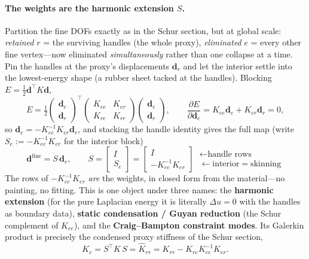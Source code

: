 \paragraph{The weights are the harmonic extension $S$.}
Partition the fine DOFs exactly as in the Schur section, but at global scale: \emph{retained} $r$ = the surviving handles (the whole proxy), \emph{eliminated} $e$ = every other fine vertex---now eliminated \emph{simultaneously} rather than one collapse at a time.
Pin the handles at the proxy's displacements $\mathbf d_r$ and let the interior settle into the lowest-energy shape (a rubber sheet tacked at the handles).
Blocking $E=\tfrac12\mathbf d^\top K\mathbf d$,
\begin{equation}
  E=\tfrac12\begin{pmatrix}\mathbf d_e\\\mathbf d_r\end{pmatrix}^{\!\top}
    \begin{pmatrix}K_{ee}&K_{er}\\K_{re}&K_{rr}\end{pmatrix}
    \begin{pmatrix}\mathbf d_e\\\mathbf d_r\end{pmatrix},
  \qquad
  \frac{\partial E}{\partial\mathbf d_e}=K_{ee}\mathbf d_e+K_{er}\mathbf d_r=0,
\end{equation}
so $\mathbf d_e=-K_{ee}^{-1}K_{er}\mathbf d_r$, and stacking the handle identity gives the full map (write $S_e:=-K_{ee}^{-1}K_{er}$ for the interior block)
\begin{equation}
  \mathbf d^{\text{fine}}=S\,\mathbf d_r,\qquad
  S=\begin{bmatrix}I\\[2pt]S_e\end{bmatrix}
   =\begin{bmatrix}I\\[2pt]-K_{ee}^{-1}K_{er}\end{bmatrix}
  \begin{array}{l}\ \leftarrow\text{handle rows}\\[2pt]
                  \ \leftarrow\text{interior}=\text{skinning}\end{array}
\end{equation}
The rows of $-K_{ee}^{-1}K_{er}$ \emph{are} the weights, in closed form from the material---no painting, no fitting.
This is one object under three names: the \textbf{harmonic extension} (for the pure Laplacian energy it is literally $\Delta u=0$ with the handles as boundary data), \textbf{static condensation / Guyan reduction} (the Schur complement of $K_{ee}$), and the \textbf{Craig--Bampton constraint modes}.
Its Galerkin product is precisely the condensed proxy stiffness of the Schur section,
\begin{equation}
  K_c=S^\top K\,S=\widehat K_{rr}=K_{rr}-K_{re}K_{ee}^{-1}K_{er}.
\end{equation}

